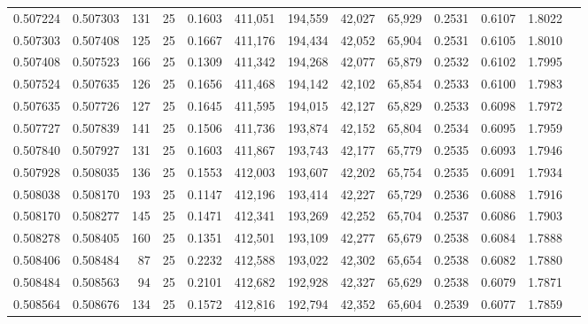 \begin{tabular}{rrrrrrrrrrrrr}
0.507224 & 0.507303 &   131 &  25 &                                     0.1603 & 411,051 & 194,559 &  42,027 &  65,929 & 0.2531 & 0.6107 & 1.8022 \\
0.507303 & 0.507408 &   125 &  25 &                                     0.1667 & 411,176 & 194,434 &  42,052 &  65,904 & 0.2531 & 0.6105 & 1.8010 \\
0.507408 & 0.507523 &   166 &  25 &                                     0.1309 & 411,342 & 194,268 &  42,077 &  65,879 & 0.2532 & 0.6102 & 1.7995 \\
0.507524 & 0.507635 &   126 &  25 &                                     0.1656 & 411,468 & 194,142 &  42,102 &  65,854 & 0.2533 & 0.6100 & 1.7983 \\
0.507635 & 0.507726 &   127 &  25 &                                     0.1645 & 411,595 & 194,015 &  42,127 &  65,829 & 0.2533 & 0.6098 & 1.7972 \\
0.507727 & 0.507839 &   141 &  25 &                                     0.1506 & 411,736 & 193,874 &  42,152 &  65,804 & 0.2534 & 0.6095 & 1.7959 \\
0.507840 & 0.507927 &   131 &  25 &                                     0.1603 & 411,867 & 193,743 &  42,177 &  65,779 & 0.2535 & 0.6093 & 1.7946 \\
0.507928 & 0.508035 &   136 &  25 &                                     0.1553 & 412,003 & 193,607 &  42,202 &  65,754 & 0.2535 & 0.6091 & 1.7934 \\
0.508038 & 0.508170 &   193 &  25 &                                     0.1147 & 412,196 & 193,414 &  42,227 &  65,729 & 0.2536 & 0.6088 & 1.7916 \\
0.508170 & 0.508277 &   145 &  25 &                                     0.1471 & 412,341 & 193,269 &  42,252 &  65,704 & 0.2537 & 0.6086 & 1.7903 \\
0.508278 & 0.508405 &   160 &  25 &                                     0.1351 & 412,501 & 193,109 &  42,277 &  65,679 & 0.2538 & 0.6084 & 1.7888 \\
0.508406 & 0.508484 &    87 &  25 &                                     0.2232 & 412,588 & 193,022 &  42,302 &  65,654 & 0.2538 & 0.6082 & 1.7880 \\
0.508484 & 0.508563 &    94 &  25 &                                     0.2101 & 412,682 & 192,928 &  42,327 &  65,629 & 0.2538 & 0.6079 & 1.7871 \\
0.508564 & 0.508676 &   134 &  25 &                                     0.1572 & 412,816 & 192,794 &  42,352 &  65,604 & 0.2539 & 0.6077 & 1.7859 \\

\end{tabular}
